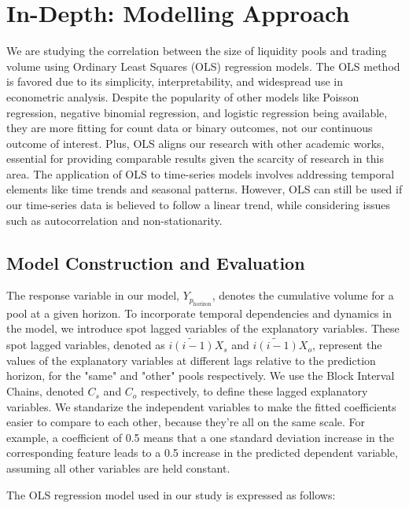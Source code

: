 \documentclass{article}
\begin{document}
\section{\textbf{In-Depth: Modelling Approach}}

We are studying the correlation between the size of liquidity pools and trading volume using Ordinary Least Squares (OLS) regression models. The OLS method is favored due to its simplicity, interpretability, and widespread use in econometric analysis. Despite the popularity of other models like Poisson regression, negative binomial regression, and logistic regression being available, they are more fitting for count data or binary outcomes, not our continuous outcome of interest. Plus, OLS aligns our research with other academic works\cite{Miori2023}, essential for providing comparable results given the scarcity of research in this area. The application of OLS to time-series models involves addressing temporal elements like time trends and seasonal patterns. However, OLS can still be used if our time-series data is believed to follow a linear trend, while considering issues such as autocorrelation and non-stationarity.

\subsection{\textbf{Model Construction and Evaluation}}


The response variable in our model, \(Y_{p_{\text{horizon}}}\), denotes the cumulative volume for a pool at a given horizon. To incorporate temporal dependencies and dynamics in the model, we introduce spot lagged variables of the explanatory variables. These spot lagged variables, denoted as \(\widetilde{i(i-1)}X_s\) and \(\widetilde{i(i-1)}X_o\), represent the values of the explanatory variables at different lags relative to the prediction horizon, for the "same" and "other" pools respectively. We use the Block Interval Chains, denoted \(C_s\) and \(C_o\) respectively, to define these lagged explanatory variables. We standarize the independent variables to make the fitted coefficients easier to compare to each other, because they're all on the same scale. For example, a coefficient of 0.5 means that a one standard deviation increase in the corresponding feature leads to a 0.5 increase in the predicted dependent variable, assuming all other variables are held constant.

The OLS regression model used in our study is expressed as follows:
\end{document}
